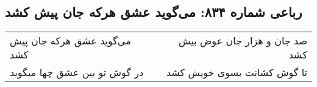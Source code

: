 \begin{center}
\section*{رباعی شماره ۸۳۴: می‌گوید عشق هرکه جان پیش کشد}
\label{sec:0834}
\begin{longtable}{l p{0.5cm} r}
می‌گوید عشق هرکه جان پیش کشد
&&
صد جان و هزار جان عوض بیش کشد
\\
در گوش تو بین عشق چها میگوید
&&
تا گوش کشانت بسوی خویش کشد
\\
\end{longtable}
\end{center}
